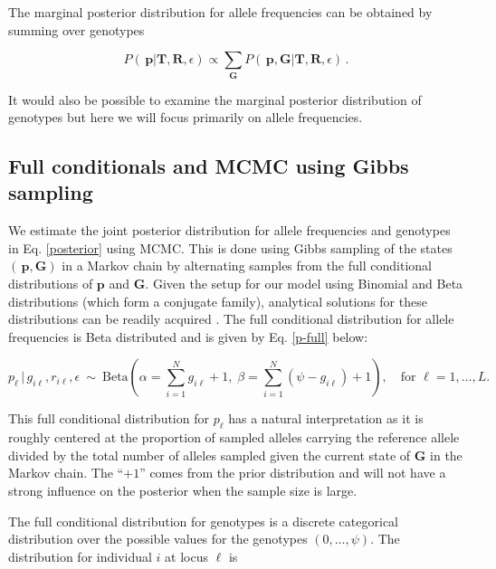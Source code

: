 \documentclass[11pt,english,letterpaper,oneside]{article}
\begin{document}
\noindent The marginal posterior distribution for allele frequencies can be obtained by summing over genotypes

\begin{equation}\label{marg_post_p}
P(\,\bm{p}|\bm{T}, \bm{R},\epsilon) \propto \displaystyle\sum_{\bm{G}} P(\,\bm{p},\bm{G}|\bm{T}, \bm{R},\epsilon)\,.
\end{equation}

\noindent It would also be possible to examine the marginal posterior distribution of genotypes but here we will focus primarily on allele frequencies.

\medskip
\subsection{Full conditionals and MCMC using Gibbs sampling} %
\medskip

\noindent We estimate the joint posterior distribution for allele frequencies and genotypes in Eq. \ref{posterior} using MCMC. This is done using Gibbs sampling of the states $(\,\bm{p},\bm{G})$ in a Markov chain by alternating samples from the full conditional distributions of $\bm{p}$ and $\bm{G}$. Given the setup for our model using Binomial and Beta distributions (which form a conjugate family), analytical solutions for these distributions can be readily acquired \citep{gelman2014bayesian}. The full conditional distribution for allele frequencies is Beta distributed and is given by Eq. \ref{p-full} below:

\begin{equation}\label{p-full}
p_{\ell}\,|\,g_{i \ell},r_{i \ell},\epsilon \: \sim \: \text{Beta}\left(\alpha= \sum_{i=1}^N g_{i \ell} +1,\; \beta = \sum_{i=1}^N (\psi-g_{i \ell})+1\right),\quad \text{for } \ell = 1,\ldots,L.
\end{equation}

\noindent This full conditional distribution for $p_{\ell}$ has a natural interpretation as it is roughly centered at the proportion of sampled alleles carrying the reference allele divided by the total number of alleles sampled given the current state of $\bm{G}$ in the Markov chain. The ``$+1$'' comes from the prior distribution and will not have a strong influence on the posterior when the sample size is large.
\medskip

The full conditional distribution for genotypes is a discrete categorical distribution over the possible values for the genotypes $(0,\ldots,\psi)$. The distribution for individual $i$ at locus $\ell$ is
\end{document}
